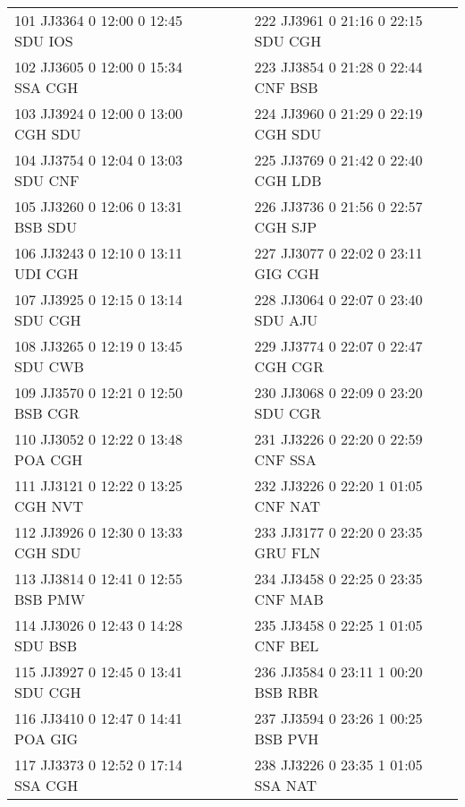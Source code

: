 \begin{scriptsize}
\begin{longtable}{l c c l}
101 JJ3364 0 12:00 0 12:45 SDU IOS & & & 222 JJ3961 0 21:16 0 22:15 SDU CGH \\

102 JJ3605 0 12:00 0 15:34 SSA CGH & & & 223 JJ3854 0 21:28 0 22:44 CNF BSB \\

103 JJ3924 0 12:00 0 13:00 CGH SDU & & & 224 JJ3960 0 21:29 0 22:19 CGH SDU \\

104 JJ3754 0 12:04 0 13:03 SDU CNF & & & 225 JJ3769 0 21:42 0 22:40 CGH LDB \\

105 JJ3260 0 12:06 0 13:31 BSB SDU & & & 226 JJ3736 0 21:56 0 22:57 CGH SJP \\

106 JJ3243 0 12:10 0 13:11 UDI CGH & & & 227 JJ3077 0 22:02 0 23:11 GIG CGH \\

107 JJ3925 0 12:15 0 13:14 SDU CGH & & & 228 JJ3064 0 22:07 0 23:40 SDU AJU \\

108 JJ3265 0 12:19 0 13:45 SDU CWB & & & 229 JJ3774 0 22:07 0 22:47 CGH CGR \\

109 JJ3570 0 12:21 0 12:50 BSB CGR & & & 230 JJ3068 0 22:09 0 23:20 SDU CGR \\

110 JJ3052 0 12:22 0 13:48 POA CGH & & & 231 JJ3226 0 22:20 0 22:59 CNF SSA \\

111 JJ3121 0 12:22 0 13:25 CGH NVT & & & 232 JJ3226 0 22:20 1 01:05 CNF NAT \\

112 JJ3926 0 12:30 0 13:33 CGH SDU & & & 233 JJ3177 0 22:20 0 23:35 GRU FLN \\

113 JJ3814 0 12:41 0 12:55 BSB PMW & & & 234 JJ3458 0 22:25 0 23:35 CNF MAB \\

114 JJ3026 0 12:43 0 14:28 SDU BSB & & & 235 JJ3458 0 22:25 1 01:05 CNF BEL \\

115 JJ3927 0 12:45 0 13:41 SDU CGH & & & 236 JJ3584 0 23:11 1 00:20 BSB RBR \\

116 JJ3410 0 12:47 0 14:41 POA GIG & & & 237 JJ3594 0 23:26 1 00:25 BSB PVH \\

117 JJ3373 0 12:52 0 17:14 SSA CGH & & & 238 JJ3226 0 23:35 1 01:05 SSA NAT \\


\end{longtable}
\end{scriptsize}
